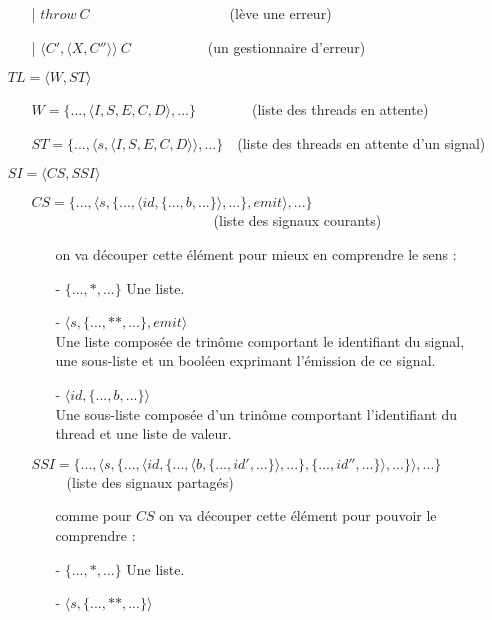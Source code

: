 \documentclass[10pt,a4paper]{article}
\begin{document}
\begin{itemize}
\begin{itemize}
						\item[|] $throw~C$~~~~~~~~~~~~~~~~~~~~(lève une erreur)
						\item[|] $\langle C',\langle X,C''\rangle\rangle~C$~~~~~~~~~~~(un gestionnaire d'erreur)
					\end{itemize}
					\item[] $TL = \langle W,ST\rangle$
					\begin{itemize}
						\item[] $W = \{...,\langle I,S,E,C,D\rangle,...\}$~~~~~~~~(liste des threads en attente)
						\item[] $ST = \{...,\langle s,\langle I,S,E,C,D\rangle\rangle,...\}$~~(liste des threads en attente d'un signal)
					\end{itemize}
					\item[] $SI = \langle CS,SSI\rangle$
					\begin{itemize}
						\item[] $CS = \{...,\langle s,\{...,\langle id,\{...,b,...\}\rangle,...\},emit\rangle,...\}$~~~~~~~~~~~~~~~~~~~~~~~~~~(liste des signaux courants)
						\begin{itemize}
							\item[] on va découper cette élément pour mieux en comprendre le sens :
							\item[] - $\{...,*,...\}$ Une liste. 
							\item[] - $\langle s,\{...,**,...\},emit\rangle$ \\
							Une liste composée de trinôme comportant le identifiant du signal, une sous-liste et un booléen exprimant l'émission de ce signal.
							\item[] - $\langle id,\{...,b,...\}\rangle$ \\
							Une sous-liste composée d'un trinôme comportant l'identifiant du thread et une liste de valeur.
						\end{itemize}
						\item[]
						\item[] $SSI =  \{...,\langle s,\{...,\langle id,\{...,\langle b,\{...,id',...\}\rangle,...\},\{...,id'',...\}\rangle,...\}\rangle,...\}$~~~~~(liste des signaux partagés)
						\begin{itemize}
							\item[] comme pour $CS$ on va découper cette élément pour pouvoir le comprendre :
							\item[] - $\{...,*,...\}$ Une liste. 
							\item[] - $\langle s,\{...,**,...\}\rangle$\\

\end{itemize}
\end{itemize}
\end{itemize}
\end{document}
